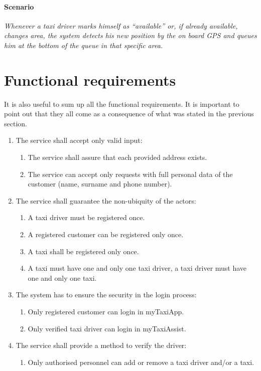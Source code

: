 \paragraph{Scenario}{\small\itshape Whenever a taxi driver marks himself as ``available'' or, if already available, changes area, the system detects his new position by the on board GPS and queues him at the bottom of the queue in that specific area.}


\section{Functional requirements}
It is also useful to sum up all the functional requirements. It is important to point out that they all come as a consequence of what was stated in the previous section.


\begin{enumerate}
	\item The service shall accept only valid input: \begin{enumerate}
		\item The service shall assure that each provided address exists.
		\item The service can accept only requests with full personal data of the customer (name, surname and phone number).
	\end{enumerate}
	
	\item The service shall guarantee the non-ubiquity of the actors: \begin{enumerate}
		\item A taxi driver must be registered once.
		\item A registered customer can be registered only once.
		\item A taxi shall be registered only once.
		\item A taxi must have one and only one taxi driver, a taxi driver must have one and only one taxi.
	\end{enumerate}
	
	\item The system has to ensure the security in the login process: \begin{enumerate}
		\item Only registered customer can login in myTaxiApp.
		\item Only verified taxi driver can login in myTaxiAssist.
	\end{enumerate}
	
	\item The service shall provide a method to verify the driver: \begin{enumerate}
		\item Only authorised personnel can add or remove a taxi driver and/or a taxi.
	\end{enumerate}
	

\end{enumerate}
